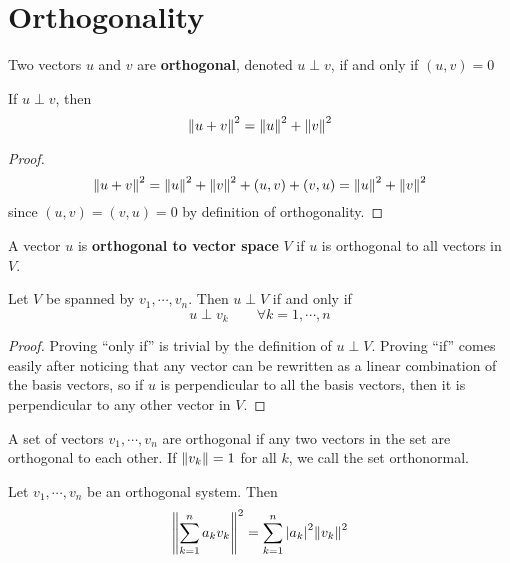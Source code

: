 \section{Orthogonality} 
\begin{definition}
Two vectors $u$ and $v$ are \textbf{orthogonal}, denoted $u \perp v$, if and only if $(u, v) = 0$
\end{definition}

\begin{theorem}
If $u \perp v$, then 
$$\norm{u + v}^{2} = \norm{u}^{2} + \norm{v}^{2}$$
\end{theorem}

\begin{proof}
$$\norm{u + v}^{2} = \norm{u}^{2} + \norm{v}^{2} + (u, v) + (v, u) = \norm{u}^{2} + \norm{v}^{2}$$
since $(u,v) = (v, u) = 0$ by definition of orthogonality. 
\end{proof}

\begin{definition}
A vector $u$ is \textbf{orthogonal to vector space} $V$ if $u$ is orthogonal to all vectors in $V$. 
\end{definition}

\begin{theorem}
Let $V$ be spanned by $v_{1}, \cdots, v_{n}$. Then $u \perp V$ if and only if 
$$u \perp v_{k} \qquad \forall k = 1, \cdots, n$$
\end{theorem}

\begin{proof}
Proving ``only if'' is trivial by the definition of $u \perp V$. Proving ``if'' comes easily after noticing that any vector can be rewritten as a linear combination of the basis vectors, so if $u$ is perpendicular to all the basis vectors, then it is perpendicular to any other vector in $V$. 
\end{proof}

\begin{definition}
A set of vectors $v_{1}, \cdots, v_{n}$ are orthogonal if any two vectors in the set are orthogonal to each other. If $\norm{v_{k}} = 1$ for all $k$, we call the set orthonormal. 
\end{definition}

\begin{lemma}
Let $v_{1}, \cdots, v_{n}$ be an orthogonal system. Then 
$$\norm{\sum_{k=1}^{n} a_{k} v_{k}}^{2} = \sum_{k=1}^{n} \abs{a_{k}}^{2} \norm{v_{k}}^{2}$$
\end{lemma}

